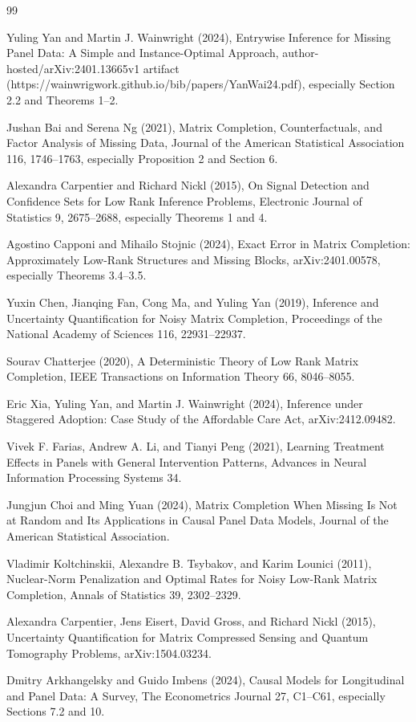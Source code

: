 \documentclass{article}
\begin{document}
\begin{thebibliography}{99}

   Yuling Yan and Martin J. Wainwright (2024), Entrywise Inference for Missing Panel Data: A Simple and Instance-Optimal Approach, author-hosted/arXiv:2401.13665v1 artifact (https://wainwrigwork.github.io/bib/papers/YanWai24.pdf), especially Section 2.2 and Theorems 1--2.

   Jushan Bai and Serena Ng (2021), Matrix Completion, Counterfactuals, and Factor Analysis of Missing Data, Journal of the American Statistical Association 116, 1746--1763, especially Proposition 2 and Section 6.

   Alexandra Carpentier and Richard Nickl (2015), On Signal Detection and Confidence Sets for Low Rank Inference Problems, Electronic Journal of Statistics 9, 2675--2688, especially Theorems 1 and 4.

   Agostino Capponi and Mihailo Stojnic (2024), Exact Error in Matrix Completion: Approximately Low-Rank Structures and Missing Blocks, arXiv:2401.00578, especially Theorems 3.4--3.5.

   Yuxin Chen, Jianqing Fan, Cong Ma, and Yuling Yan (2019), Inference and Uncertainty Quantification for Noisy Matrix Completion, Proceedings of the National Academy of Sciences 116, 22931--22937.

   Sourav Chatterjee (2020), A Deterministic Theory of Low Rank Matrix Completion, IEEE Transactions on Information Theory 66, 8046--8055.

   Eric Xia, Yuling Yan, and Martin J. Wainwright (2024), Inference under Staggered Adoption: Case Study of the Affordable Care Act, arXiv:2412.09482.

   Vivek F. Farias, Andrew A. Li, and Tianyi Peng (2021), Learning Treatment Effects in Panels with General Intervention Patterns, Advances in Neural Information Processing Systems 34.

   Jungjun Choi and Ming Yuan (2024), Matrix Completion When Missing Is Not at Random and Its Applications in Causal Panel Data Models, Journal of the American Statistical Association.

   Vladimir Koltchinskii, Alexandre B. Tsybakov, and Karim Lounici (2011), Nuclear-Norm Penalization and Optimal Rates for Noisy Low-Rank Matrix Completion, Annals of Statistics 39, 2302--2329.

   Alexandra Carpentier, Jens Eisert, David Gross, and Richard Nickl (2015), Uncertainty Quantification for Matrix Compressed Sensing and Quantum Tomography Problems, arXiv:1504.03234.

   Dmitry Arkhangelsky and Guido Imbens (2024), Causal Models for Longitudinal and Panel Data: A Survey, The Econometrics Journal 27, C1--C61, especially Sections 7.2 and 10.

\end{thebibliography}
\end{document}
